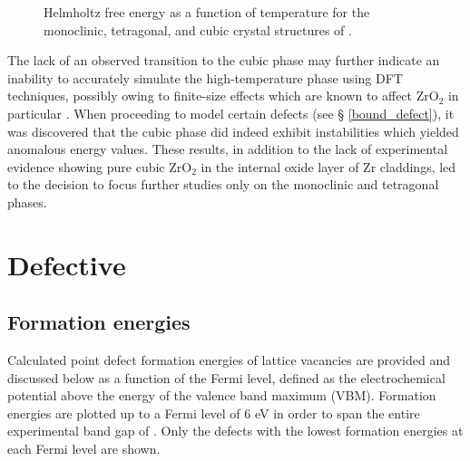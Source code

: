 \begin{figure}[ht] %
\begin{center}
		\caption{Helmholtz free energy as a function of temperature for the monoclinic, tetragonal, and cubic crystal structures of \zirconia .}
		\label{Figure:helmholtz}
	\end{center}
\end{figure}

The lack of an observed transition to the cubic phase may further indicate an inability to accurately simulate the high-temperature phase using DFT techniques, possibly owing to finite-size effects which are known to affect ZrO$_{2}$ in particular \cite{burr2017importance}. When proceeding to model certain defects (see § \ref{bound_defect}), it was discovered that the cubic phase did indeed exhibit instabilities which yielded anomalous energy values. These results, in addition to the lack of experimental evidence showing pure cubic ZrO$_{2}$ in the internal oxide layer of Zr claddings, led to the decision to focus further studies only on the monoclinic and tetragonal phases.

\section{Defective \zirconia} \label{dis_form_energy_intrinsic}

\subsection{Formation energies}

Calculated point defect formation energies of lattice vacancies are provided and discussed below as a function of the Fermi level, defined as the electrochemical potential above the energy of the valence band maximum (VBM). Formation energies are plotted up to a Fermi level of 6 eV in order to span the entire experimental band gap of \zirconia . Only the defects with the lowest formation energies at each Fermi level are shown.

